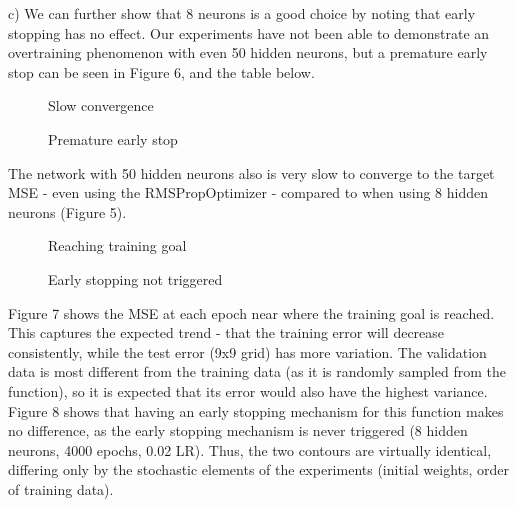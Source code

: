 \documentclass[11pt]{article}
\begin{document}
\begin{enumerate}
c) We can further show that 8 neurons is a good choice by noting that early stopping has no effect. Our experiments have not been able to demonstrate an overtraining phenomenon with even 50 hidden neurons, but a premature early stop can be seen in Figure 6, and the table below.\newline
%

\begin{figure}[h!]
    \centering
    \begin{minipage}{0.45\textwidth}
        \centering
        \caption{Slow convergence}
    \end{minipage}\hfill
    \begin{minipage}{0.45\textwidth}
        \centering
        \caption{Premature early stop}
    \end{minipage}
\end{figure}

The network with 50 hidden neurons also is very slow to converge to the target MSE - even using the RMSPropOptimizer - compared to when using 8 hidden neurons (Figure 5).\newline

\begin{figure}[h!]
    \centering
    \begin{minipage}{0.45\textwidth}
        \centering
        \caption{Reaching training goal}
    \end{minipage}\hfill
    \begin{minipage}{0.45\textwidth}
        \centering
        \caption{Early stopping not triggered}
    \end{minipage}
\end{figure}

Figure 7 shows the MSE at each epoch near where the training goal is reached. This captures the expected trend - that the training error will decrease consistently, while the test error (9x9 grid) has more variation. The validation data is most different from the training data (as it is randomly sampled from the function), so it is expected that its error would also have the highest variance.\newline
\newline
Figure 8 shows that having an early stopping mechanism for this function makes no difference, as the early stopping mechanism is never triggered (8 hidden neurons, 4000 epochs, 0.02 LR). Thus, the two contours are virtually identical, differing only by the stochastic elements of the experiments (initial weights, order of training data). 


\end{enumerate}
\end{document}
